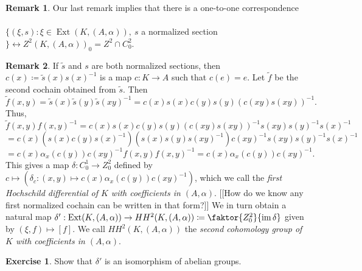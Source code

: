 \documentclass[10pt,letterpaper,cm]{nupset}
\theoremstyle{definition}
\newtheorem{remark}{Remark}
\newtheorem{exercise}{Exercise}
\newcommand{\1}{\mathbf{1}}
\newcommand{\0}{\vec 0}
\DeclareMathOperator{\ext}{Ext}
\DeclareMathOperator{\im}{im}
\begin{document}
\begin{remark}
Our last remark implies that there is a one-to-one correspondence 
\\ \\
$\{(\xi, s) : \xi \in \ext(K, (A, \alpha)), \ s$ a normalized section$\} \longleftrightarrow Z^2(K, (A, \alpha))_0 = Z^2 \cap C^2_0$.
\end{remark}

\begin{remark}
If $\tilde{s}$ and $s$ are both normalized sections, then $c(x)\coloneqq \tilde{s}(x)s(x)^{-1}$ is a map $c : K \to A$ such that $c(e) =e$. Let $\tilde{f}$ be the second cochain obtained from $\tilde{s}$. Then  $\tilde{f}(x, y) = \tilde{s}(x)\tilde{s}(y)\tilde{s}(xy)^{-1} =c(x)s(x)c(y)s(y)(c(xy)s(xy))^{-1}.$ Thus, 
$$\tilde{f}(x, y)f(x,y)^{-1} = c(x)s(x)c(y)s(y)(c(xy)s(xy))^{-1}s(xy)s(y)^{-1}s(x)^{-1}$$ $$ = c(x)(s(x)c(y)s(x)^{-1})(s(x)s(y)s(xy)^{-1})c(xy)^{-1}s(xy)s(y)^{-1}s(x)^{-1}$$ $$ = c(x)\alpha_x(c(y))c(xy)^{-1}f(x,y)f(x,y)^{-1} =c(x)\alpha_x(c(y))c(xy)^{-1}. $$
This gives a map $\delta: C^1_0 \to Z^2_0$ defined by $c \mapsto (\delta_c : (x, y) \mapsto   c(x)\alpha_x(c(y))c(xy)^{-1})$, which we call the \textit{first Hochschild differential of $K$ with coefficients in $(A, \alpha)$}. {[[How do we know any first normalized cochain can be written in that form?]]}
We in turn obtain a natural map $\delta': \ext(K, (A, \alpha)) \to HH^2(K, (A, \alpha)) \coloneqq  \faktor{Z^2_0}{\im \delta}$ given by $(\xi, f) \mapsto [f]$. We call $HH^2(K, (A, \alpha))$ the \textit{second cohomology group of $K$ with coefficients in $(A, \alpha)$}.
\end{remark}

\begin{exercise}
Show that $\delta '$ is an isomorphism of abelian groups.
\end{exercise}
\end{document}
